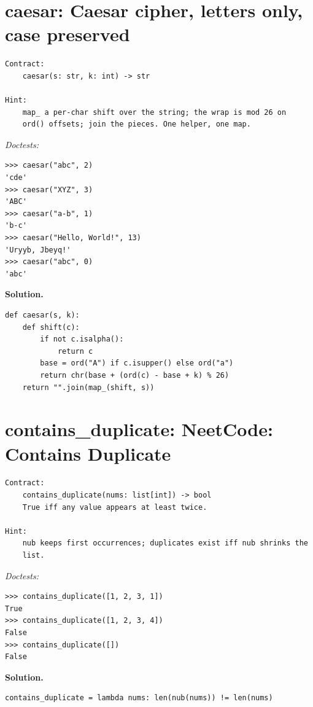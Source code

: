 \documentclass[11pt,letterpaper]{book}
\begin{document}
\section{caesar: Caesar cipher, letters only, case preserved}
\begin{lstlisting}[style=spec]
Contract:
    caesar(s: str, k: int) -> str

Hint:
    map_ a per-char shift over the string; the wrap is mod 26 on
    ord() offsets; join the pieces. One helper, one map.
\end{lstlisting}
\noindent\textit{Doctests:}
\begin{lstlisting}[style=spec]
>>> caesar("abc", 2)
'cde'
>>> caesar("XYZ", 3)
'ABC'
>>> caesar("a-b", 1)
'b-c'
>>> caesar("Hello, World!", 13)
'Uryyb, Jbeyq!'
>>> caesar("abc", 0)
'abc'
\end{lstlisting}
\noindent\textbf{Solution.}
\begin{lstlisting}[style=code]
def caesar(s, k):
    def shift(c):
        if not c.isalpha():
            return c
        base = ord("A") if c.isupper() else ord("a")
        return chr(base + (ord(c) - base + k) % 26)
    return "".join(map_(shift, s))
\end{lstlisting}

\section{contains\_duplicate: NeetCode: Contains Duplicate}
\begin{lstlisting}[style=spec]
Contract:
    contains_duplicate(nums: list[int]) -> bool
    True iff any value appears at least twice.

Hint:
    nub keeps first occurrences; duplicates exist iff nub shrinks the
    list.
\end{lstlisting}
\noindent\textit{Doctests:}
\begin{lstlisting}[style=spec]
>>> contains_duplicate([1, 2, 3, 1])
True
>>> contains_duplicate([1, 2, 3, 4])
False
>>> contains_duplicate([])
False
\end{lstlisting}
\noindent\textbf{Solution.}
\begin{lstlisting}[style=code]
contains_duplicate = lambda nums: len(nub(nums)) != len(nums)
\end{lstlisting}
\end{document}
